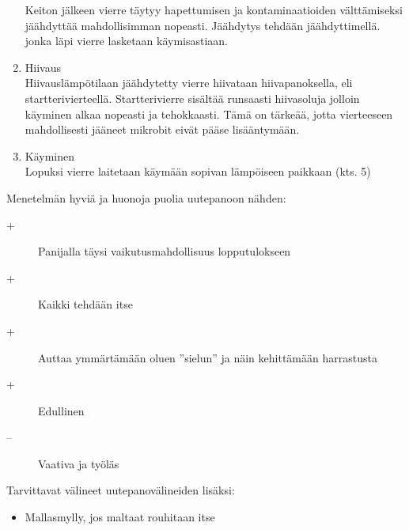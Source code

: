 \documentclass[a4paper,11pt]{report}
\begin{document}
\begin{enumerate}
Keiton jälkeen vierre täytyy hapettumisen ja kontaminaatioiden välttämiseksi jäähdyttää mahdollisimman nopeasti. Jäähdytys tehdään jäähdyttimellä. jonka läpi vierre lasketaan käymisastiaan.
\item Hiivaus \hfill \\
Hiivauslämpötilaan jäähdytetty vierre hiivataan hiivapanoksella, eli startterivierteellä. Startterivierre sisältää runsaasti hiivasoluja jolloin käyminen alkaa nopeasti ja tehokkaasti. Tämä on tärkeää, jotta vierteeseen mahdollisesti jääneet mikrobit eivät pääse lisääntymään.
\item Käyminen \hfill \\
Lopuksi vierre laitetaan käymään sopivan lämpöiseen paikkaan (kts. 5)
\end{enumerate}
Menetelmän hyviä ja huonoja puolia uutepanoon nähden:
\begin{description}
\item[+] Panijalla täysi vaikutusmahdollisuus lopputulokseen
\item[+] Kaikki tehdään itse
\item[+] Auttaa ymmärtämään oluen ''sielun'' ja näin kehittämään harrastusta 
\item[+] Edullinen
\item[--] Vaativa ja työläs
\end{description}
Tarvittavat välineet uutepanovälineiden lisäksi:
\begin{itemize}
\item Mallasmylly, jos maltaat rouhitaan itse
\end{itemize}
\end{document}
